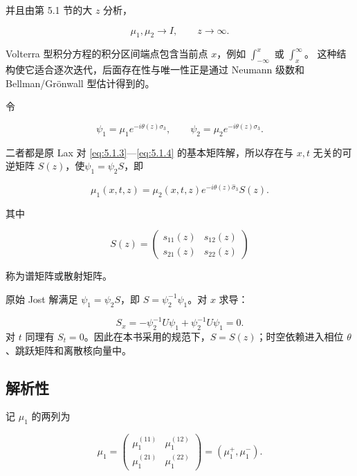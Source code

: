 \documentclass[
    lang=cn,
    scheme=chinese,
    mode=simple,
    device=normal,
    color=blue,
    math=cm,
    thmcnt=section,
    12pt,
    nowatermark
]{elegantbook}
\begin{document}
并且由第 5.1 节的大 $z$ 分析，

\[
    \mu_1,\mu_2\to I,\qquad z\to\infty.
\]

\begin{callout}
    Volterra 型积分方程的积分区间端点包含当前点 $x$，例如 $\displaystyle\int_{-\infty}^x$ 或 $\displaystyle\int_x^\infty$。
    这种结构使它适合逐次迭代，后面存在性与唯一性正是通过 Neumann 级数和 Bellman/Grönwall 型估计得到的。
\end{callout}

令

\[
    \psi_1=\mu_1e^{-i\theta(z)\sigma_3},
    \qquad
    \psi_2=\mu_2e^{-i\theta(z)\sigma_3}.
\]

二者都是原 Lax 对 \eqref{eq:5.1.3}---\eqref{eq:5.1.4} 的基本矩阵解，所以存在与 $x,t$ 无关的可逆矩阵 $S(z)$，使$\psi_1=\psi_2S$，即

\begin{equation}
    \mu_1(x,t,z)
    =
    \mu_2(x,t,z)e^{-i\theta(z)\widehat{\sigma}_3}S(z).
    \tag{5.2.3}
    \label{eq:5.2.3}
\end{equation}

其中

\[
    S(z)=
    \begin{pmatrix}
        s_{11}(z) & s_{12}(z) \\
        s_{21}(z) & s_{22}(z)
    \end{pmatrix}
\]

称为谱矩阵或散射矩阵。

\begin{callout}[为什么 $S$ 与 $x,t$ 无关？]
    原始 Jost 解满足 $\psi_1=\psi_2S$，即 $S=\psi_2^{-1}\psi_1$。对 $x$ 求导：

    \[
        S_x
        =
        -\psi_2^{-1}U\psi_1+\psi_2^{-1}U\psi_1
        =0.
    \]
    对 $t$ 同理有 $S_t=0$。因此在本书采用的规范下，$S=S(z)$；时空依赖进入相位 $\theta$、跳跃矩阵和离散核向量中。
\end{callout}

\subsection{解析性}

记 $\mu_1$ 的两列为

\begin{equation}
    \mu_1
    =
    \begin{pmatrix}
        \mu_1^{(11)} & \mu_1^{(12)} \\
        \mu_1^{(21)} & \mu_1^{(22)}
    \end{pmatrix}
    =
    (\mu_1^+,\mu_1^-).
    \tag{5.2.4}
    \label{eq:5.2.4}
\end{equation}
\end{document}

